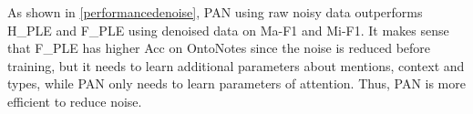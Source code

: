 \documentclass[letterpaper]{article} %
\begin{document}
As shown in \tablename  \ref{performancedenoise}, %
PAN using raw noisy data outperforms H\_PLE and F\_PLE using denoised data on Ma-F1 and Mi-F1. 
It makes sense that F\_PLE has higher Acc on OntoNotes since the noise is reduced before training, but it needs to learn additional parameters about mentions, context and types, %
while PAN only needs to learn parameters of attention. Thus, PAN  is more efficient to reduce noise. %
\end{document}
